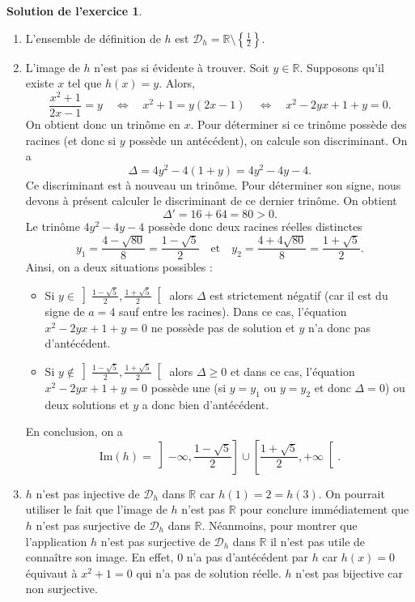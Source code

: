 \documentclass[a4paper, 11pt,openany]{article}%
\theoremstyle{plain}
\theoremstyle{definition}
\newtheorem{sol}{Solution de l'exercice}
\theoremstyle{remark}
\newcommand{\R}{\mathbb{R}}
\newcommand{\calD}{\mathcal{D}}
\newcommand{\im}{\text{Im}}
\begin{document}
\begin{sol}
\begin{enumerate}
\item L'ensemble de définition de $h$ est $\calD_h = \R \setminus \left\{ \frac{1}{2} \right\}$.
\item L'image de $h$ n'est pas si évidente à trouver. Soit $y \in \R$. Supposons qu'il existe $x$ tel que $h(x) =y$. Alors,
\[ \frac{x^2 +1}{2x - 1} = y \quad \Leftrightarrow \quad x^2 +1 = y(2x - 1) \quad \Leftrightarrow \quad x^2 - 2yx +1 + y =0.\]
On obtient donc un trinôme en $x$. Pour déterminer si ce trinôme possède des racines (et donc si $y$ possède un antécédent), on calcule son discriminant. On a
\[ \Delta = 4y^2 - 4(1+y) = 4y^2 - 4y - 4.\]
Ce discriminant est à nouveau un trinôme. Pour déterminer son signe, nous devons à présent calculer le discriminant de ce dernier trinôme. On obtient
\[ \Delta' = 16 + 64 = 80 > 0.\]
Le trinôme $4y^2 - 4y - 4$ possède donc deux racines réelles distinctes
\[ y_1 = \frac{4 - \sqrt{80}}{8} = \frac{1 - \sqrt{5}}{2} \quad \text{et} \quad y_2 = \frac{4 + 4\sqrt{80}}{8} = \frac{1 +\sqrt{5}}{2}.\]
Ainsi, on a deux situations possibles :
\begin{itemize}
\item Si $y \in \left]  \frac{1 - \sqrt{5}}{2} ,  \frac{1 + \sqrt{5}}{2} \right[$ alors $\Delta$ est strictement négatif (car il est du signe de $a = 4$ sauf entre les racines). Dans ce cas, l'équation $x^2 - 2yx +1 + y =0$ ne possède pas de solution et $y$ n'a donc pas d'antécédent.
\item Si $y \notin \left]  \frac{1 - \sqrt{5}}{2} ,  \frac{1 + \sqrt{5}}{2} \right[$ alors $\Delta \geqslant 0$ et dans ce cas, l'équation $x^2 - 2yx +1 + y =0$ possède une (si $y = y_1$ ou $y = y_2$ et donc $\Delta = 0$) ou deux solutions et $y$ a donc bien d'antécédent.
\end{itemize}
En conclusion, on a
\[ \im(h)= \left] - \infty ,  \frac{1 - \sqrt{5}}{2} \right] \cup \left[  \frac{1 + \sqrt{5}}{2} , + \infty \right[.\]
\item $h$ n'est pas injective de $\calD_h$ dans $\R$ car $h(1) = 2 = h(3)$. On pourrait utiliser le fait que l'image de $h$ n'est pas $\R$ pour conclure immédiatement que $h$ n'est pas surjective de $\mathcal{D}_h$ dans $\R$. Néanmoins, pour montrer que l'application $h$ n'est pas surjective de $\calD_h$ dans $\R$ il n'est pas utile de connaître son image. En effet, $0$ n'a pas d'antécédent par $h$ car $h(x) = 0$ équivaut à $x^2 +1 =0$ qui n'a pas de solution réelle. $h$ n'est pas bijective car non surjective.
\end{enumerate}
\end{sol}
\end{document}

